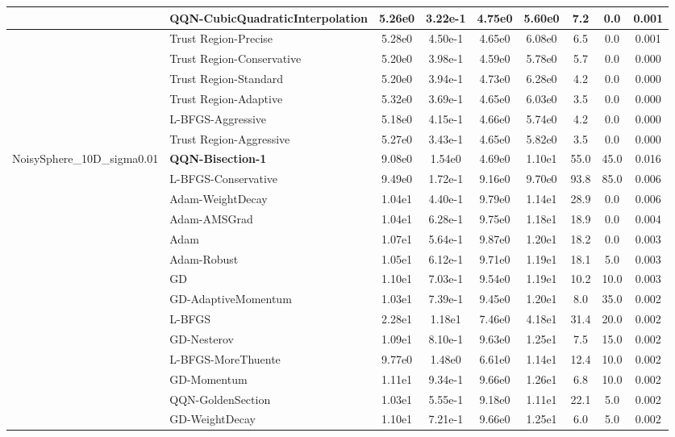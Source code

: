 \documentclass[10pt]{article}
\begin{document}
\begin{longtable}{|l|l|c|c|c|c|c|c|c|}
\hline
 & QQN-CubicQuadraticInterpolation & 5.26e0 & 3.22e-1 & 4.75e0 & 5.60e0 & 7.2 & 0.0 & 0.001 \\
\hline
 & Trust Region-Precise & 5.28e0 & 4.50e-1 & 4.65e0 & 6.08e0 & 6.5 & 0.0 & 0.001 \\
\hline
 & Trust Region-Conservative & 5.20e0 & 3.98e-1 & 4.59e0 & 5.78e0 & 5.7 & 0.0 & 0.000 \\
\hline
 & Trust Region-Standard & 5.20e0 & 3.94e-1 & 4.73e0 & 6.28e0 & 4.2 & 0.0 & 0.000 \\
\hline
 & Trust Region-Adaptive & 5.32e0 & 3.69e-1 & 4.65e0 & 6.03e0 & 3.5 & 0.0 & 0.000 \\
\hline
 & L-BFGS-Aggressive & 5.18e0 & 4.15e-1 & 4.66e0 & 5.74e0 & 4.2 & 0.0 & 0.000 \\
\hline
 & Trust Region-Aggressive & 5.27e0 & 3.43e-1 & 4.65e0 & 5.82e0 & 3.5 & 0.0 & 0.000 \\
NoisySphere\_10D\_sigma0.01 & \textbf{QQN-Bisection-1} & 9.08e0 & 1.54e0 & 4.69e0 & 1.10e1 & 55.0 & 45.0 & 0.016 \\
\hline
 & L-BFGS-Conservative & 9.49e0 & 1.72e-1 & 9.16e0 & 9.70e0 & 93.8 & 85.0 & 0.006 \\
\hline
 & Adam-WeightDecay & 1.04e1 & 4.40e-1 & 9.79e0 & 1.14e1 & 28.9 & 0.0 & 0.006 \\
\hline
 & Adam-AMSGrad & 1.04e1 & 6.28e-1 & 9.75e0 & 1.18e1 & 18.9 & 0.0 & 0.004 \\
\hline
 & Adam & 1.07e1 & 5.64e-1 & 9.87e0 & 1.20e1 & 18.2 & 0.0 & 0.003 \\
\hline
 & Adam-Robust & 1.05e1 & 6.12e-1 & 9.71e0 & 1.19e1 & 18.1 & 5.0 & 0.003 \\
\hline
 & GD & 1.10e1 & 7.03e-1 & 9.54e0 & 1.19e1 & 10.2 & 10.0 & 0.003 \\
\hline
 & GD-AdaptiveMomentum & 1.03e1 & 7.39e-1 & 9.45e0 & 1.20e1 & 8.0 & 35.0 & 0.002 \\
\hline
 & L-BFGS & 2.28e1 & 1.18e1 & 7.46e0 & 4.18e1 & 31.4 & 20.0 & 0.002 \\
\hline
 & GD-Nesterov & 1.09e1 & 8.10e-1 & 9.63e0 & 1.25e1 & 7.5 & 15.0 & 0.002 \\
\hline
 & L-BFGS-MoreThuente & 9.77e0 & 1.48e0 & 6.61e0 & 1.14e1 & 12.4 & 10.0 & 0.002 \\
\hline
 & GD-Momentum & 1.11e1 & 9.34e-1 & 9.66e0 & 1.26e1 & 6.8 & 10.0 & 0.002 \\
\hline
 & QQN-GoldenSection & 1.03e1 & 5.55e-1 & 9.18e0 & 1.11e1 & 22.1 & 5.0 & 0.002 \\
\hline
 & GD-WeightDecay & 1.10e1 & 7.21e-1 & 9.66e0 & 1.25e1 & 6.0 & 5.0 & 0.002 \\

\end{longtable}
\end{document}
